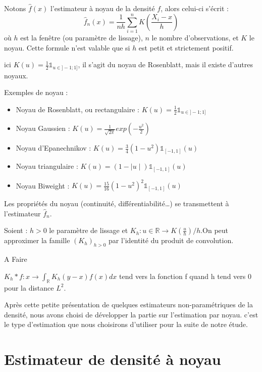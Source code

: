 \documentclass[
]{book}
\begin{document}
Notons \(\hat f(x)\) l'estimateur à noyau de la densité \(f\), alors celui-ci s'écrit :
\[
\hat f_n(x) = \frac1{nh} \sum\limits_{i=1}^n K\left(\frac{X_i-x}h\right)
\]
où \(h\) est la fenêtre (ou paramètre de lissage), \(n\) le nombre d'observations, et \(K\) le noyau.
Cette formule n'est valable que si \(h\) est petit et strictement positif.

ici \(K(u)= \frac12 \mathds{1}_{u \in ]-1;1]}\), il s'agit du noyau de Rosenblatt, mais il existe d'autres noyaux.

Exemples de noyau :

\begin{itemize}
\item
  Noyau de Rosenblatt, ou rectangulaire : \(K(u)= \frac12 \mathds{1}_{u\in]-1;1]}\)
\item
  Noyau Gaussien : \(K(u) =\frac1{\sqrt{2\pi}}exp(-\frac{u^2}2)\)
\item
  Noyau d'Epanechnikov : \(K(u) =\frac34(1-u^2)\mathds{1}_{[-1,1]}(u)\)
\item
  Noyau triangulaire : \(K(u) = (1-\mid u \mid)\mathds{1}_{[-1,1]}(u)\)
\item
  Noyau Biweight : \(K(u) = \frac{15}{16}(1-u^2)^2\mathds{1}_{[-1,1]}(u)\)
\end{itemize}

Les propriétés du noyau (continuité, différentiabilité\ldots) se transmettent à l'estimateur \(\hat f_n\).

\begin{lem}  
Soient :\newline 
$h>0$ le paramètre de lissage et $K_h : u\in \mathbb{R} \rightarrow K(\frac{u}{h})/h$.On peut approximer la famille $(K_h)_{h>0}$ par l'identité du produit de convolution.
\end{lem}

\begin{demo}
A Faire
\end{demo}

\begin{corol}
$K_h * f : x \rightarrow \int_{\mathbb R} K_h(y-x) f(x) dx$ tend vers la fonction f quand h tend vers 0 pour la distance $L^2$.
\end{corol}

Après cette petite présentation de quelques estimateurs non-paramétriques de la densité, nous avons choisi de développer la partie sur l'estimation par noyau. c'est le type d'estimation que nous choisirons d'utiliser pour la suite de notre étude.

\hypertarget{estimateur-de-densituxe9-uxe0-noyau}{%
\chapter{Estimateur de densité à noyau}\label{estimateur-de-densituxe9-uxe0-noyau}}
\end{document}
